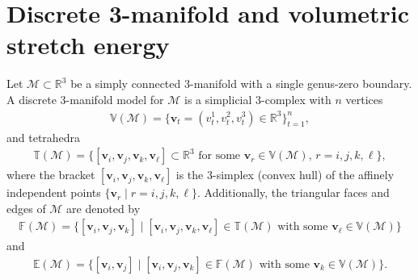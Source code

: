 \documentclass[onefignum,onetabnum]{siamonline220329}
\numberwithin{equation}{section}
\def\bv{\mathbf{v}}
\begin{document}
\begin{sloppypar}
\section{Discrete 3-manifold and volumetric stretch energy}
\label{sec:2}

Let $\mathcal{M}\subset\mathbb{R}^3$ be a simply connected 3-manifold with a single genus-zero boundary. A discrete 3-manifold model for $\mathcal{M}$ is a simplicial $3$-complex with $n$ vertices
\begin{align*}
\mathbb{V}(\mathcal{M})=\{\bv_t=({v}_t^1, {v}_t^2, {v}_t^3)\in\mathbb{R}^3\}_{t=1}^n,
\end{align*}
and tetrahedra
\begin{align*}
\mathbb{T}(\mathcal{M})=\{[\bv_i, \bv_j, \bv_k, \bv_\ell]\subset\mathbb{R}^3 \text{ for some $\bv_r\in\mathbb{V}(\mathcal{M})$, $r=i, j, k, \ell$}\},
\end{align*}
where the bracket $[\bv_i, \bv_j, \bv_k, \bv_\ell]$ is the 3-simplex (convex hull) of the affinely independent points $\{\bv_r \mid r=i, j, k, \ell\}$. Additionally, the triangular faces and edges of $\mathcal{M}$ are denoted by
\begin{align*}
\mathbb{F}(\mathcal{M})=\{[\bv_i, \bv_j, \bv_k] \mid [\bv_i, \bv_j, \bv_k, \bv_\ell]\in\mathbb{T}(\mathcal{M}) \text{ with some $\bv_\ell\in\mathbb{V}(\mathcal{M})$}\}
\end{align*}
and 
\begin{align*}
\mathbb{E}(\mathcal{M})=\{[\bv_i, \bv_j] \mid [\bv_i, \bv_j, \bv_k]\in\mathbb{F}(\mathcal{M}) \text{ with some $\bv_k\in\mathbb{V}(\mathcal{M})$}\}.
\end{align*}


\end{sloppypar}
\end{document}
